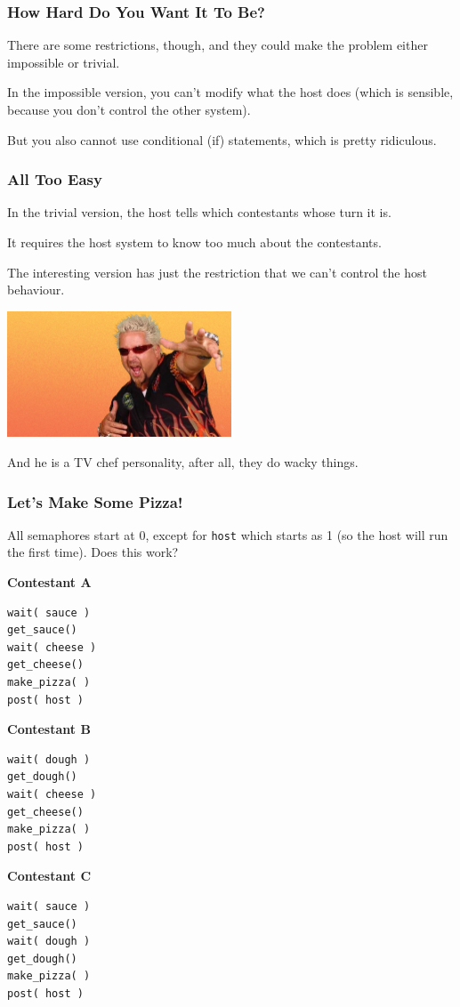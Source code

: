 \begin{frame}
	\frametitle{How Hard Do You Want It To Be?}

	There are some restrictions, though, and they could make the problem either impossible or trivial.

	In the impossible version, you can't modify what the host does (which is sensible, because you don't control the other system).

	But you also cannot use conditional (if) statements, which is pretty ridiculous.

\end{frame}

\begin{frame}
	\frametitle{All Too Easy}

	In the trivial version, the host tells which contestants whose turn it is.

	It requires the host system to know too much about the contestants.

	The interesting version has just the restriction that we can't control the host behaviour.



	\begin{center}
		\includegraphics[width=0.5\textwidth]{images/fieri.jpg}
	\end{center}

	And he is a TV chef personality, after all, they do wacky things.


\end{frame}


\begin{frame}[fragile]
	\frametitle{Let's Make Some Pizza!}
	All semaphores start at 0, except for \texttt{host} which starts as 1 (so the host will run the first time). Does this work?

	\begin{multicols}{3}
		\textbf{Contestant A}
		\begin{lstlisting}
wait( sauce )
get_sauce()
wait( cheese )
get_cheese()
make_pizza( )
post( host )
\end{lstlisting}
		\columnbreak
		\textbf{Contestant B}
		\begin{lstlisting}
wait( dough )
get_dough()
wait( cheese )
get_cheese()
make_pizza( )
post( host )
\end{lstlisting}
		\columnbreak
		\textbf{Contestant C}
		\begin{lstlisting}
wait( sauce )
get_sauce()
wait( dough )
get_dough()
make_pizza( )
post( host )
\end{lstlisting}
	\end{multicols}

\end{frame}


